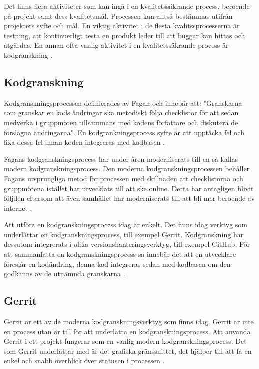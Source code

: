 Det finns flera aktiviteter som kan ingå i en kvalitetssäkrande process, beroende på projekt samt dess kvalitetsmål. Processen kan alltså bestämmas utifrån projektets syfte och mål. En viktig aktivitet i de flesta kvalitssprocesserna är testning, att kontinuerligt testa en produkt leder till att buggar kan hittas och åtgärdas. En annan ofta vanlig aktivitet i en kvalitetssäkrande process är kodgranskning \cite{feldman2005quality}.

\subsection{Kodgranskning}
Kodgranskningsprocessen definierades av Fagan \cite{fagan1999design} och innebär att: "Granskarna som granskar en kods ändringar ska metodiskt följa checklistor för att sedan medverka i gruppmöten tillsammans med kodens författare och diskutera de förslagna ändringarna". En kodgrankningsprocess syfte är att upptäcka fel och fixa dessa fel innan koden integreras med kodbasen \cite{mcintosh2014impact}. 

Fagans \cite{fagan1999design} kodgranskningsprocess har under åren moderniserats till en så kallas modern kodgranskningsprocess. Den moderna kodgranskningsprocessen behåller Fagans ursprungliga metod för processen med skillnaden att checklistorna och gruppmötena istället har utvecklats till att ske online. Detta har antagligen blivit följden eftersom att även samhället har moderniserats till att bli mer beroende av internet \cite{shimagaki2016study}.

Att utföra en kodgranskningsprocess idag är enkelt. Det finns idag verktyg som underlättar en kodgranskningsprocess, till exempel Gerrit. Kodgranskning har dessutom integrerats i olika versionshanteringsverktyg, till exempel GitHub. För att sammanfatta en kodgranskningsprocess så innebär det att en utvecklare föreslår en kodändring, denna kod integreras sedan med kodbasen om den godkänns av de utnämnda granskarna \cite{shimagaki2016study}.


\subsection{Gerrit}
Gerrit är ett av de moderna kodgranskningsverktyg som finns idag. Gerrit är inte en process utan är till för att underlätta en kodgranskningsprocess. Att använda Gerrit i ett projekt fungerar som en vanlig modern kodgranskningsprocess. Det som Gerrit underlättar med är det grafiska gränssnittet, det hjälper till att få en enkel och snabb överblick över statusen i processen \cite{mcintosh2014impact}.

